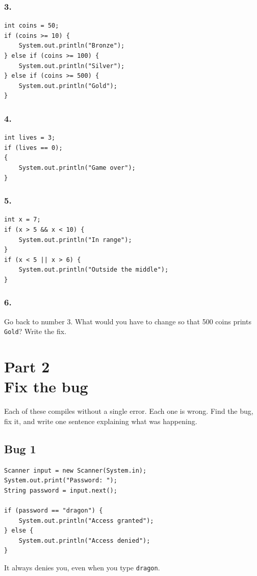 \documentclass[11pt]{article}
\newcommand{\parttag}[1]{{\sffamily\footnotesize\color{arcane}#1}\\[1pt]}
\newcommand{\code}[1]{\texttt{#1}}
\begin{document}
\subsubsection*{3.}
\begin{lstlisting}
int coins = 50;
if (coins >= 10) {
    System.out.println("Bronze");
} else if (coins >= 100) {
    System.out.println("Silver");
} else if (coins >= 500) {
    System.out.println("Gold");
}
\end{lstlisting}

\subsubsection*{4.}
\begin{lstlisting}
int lives = 3;
if (lives == 0);
{
    System.out.println("Game over");
}
\end{lstlisting}

\subsubsection*{5.}
\begin{lstlisting}
int x = 7;
if (x > 5 && x < 10) {
    System.out.println("In range");
}
if (x < 5 || x > 6) {
    System.out.println("Outside the middle");
}
\end{lstlisting}

\subsubsection*{6.}
Go back to number 3. What would you have to change so that 500 coins prints \code{Gold}? Write the fix.


\section{\parttag{Part 2}Fix the bug}

Each of these compiles without a single error. Each one is wrong. Find the bug, fix it, and write one sentence explaining what was happening.

\subsection*{Bug 1}
\begin{lstlisting}
Scanner input = new Scanner(System.in);
System.out.print("Password: ");
String password = input.next();

if (password == "dragon") {
    System.out.println("Access granted");
} else {
    System.out.println("Access denied");
}
\end{lstlisting}
It always denies you, even when you type \code{dragon}.
\end{document}
